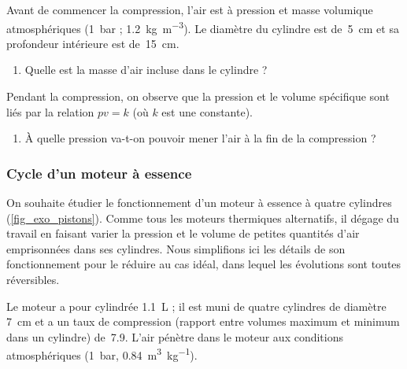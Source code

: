 	Avant de commencer la compression, l’air est à pression et masse volumique atmosphériques (\SI{1}{\bar} ; \SI{1,2}{\kilogram\per\metre\cubed}). Le diamètre du cylindre est de~\SI{5}{\centi\metre} et sa profondeur intérieure est de~\SI{15}{\centi\metre}.
	
	\begin{enumerate}
		\item Quelle est la masse d’air incluse dans le cylindre ?
	\end{enumerate}


	Pendant la compression, on observe que la pression et le volume spécifique sont liés par la relation $p v = k$ (où $k$ est une constante).

	\begin{enumerate}
		\item À quelle pression va-t-on pouvoir mener l’air à la fin de la compression ?
	\end{enumerate}


\subsubsection{Cycle d’un moteur à essence}
\label{exo_cycle_moteur_essence}

	On souhaite étudier le fonctionnement d’un moteur à essence à quatre cylindres (\cref{fig_exo_pistons}). Comme tous les moteurs thermiques alternatifs, il dégage du travail en faisant varier la pression et le volume de petites quantités d’air emprisonnées dans ses cylindres. Nous simplifions ici les détails de son fonctionnement pour le réduire au cas idéal, dans lequel les évolutions sont toutes réversibles.
	
	Le moteur a pour cylindrée \SI{1,1}{\liter} ; il est muni de quatre cylindres de diamètre \SI{7}{\centi\metre} et a un taux de compression (rapport entre volumes maximum et minimum dans un cylindre) de~\num{7,9}. L’air pénètre dans le moteur aux conditions atmosphériques (\SI{1}{\bar}, \SI{0,84}{\metre\cubed\per\kilogram}).
	
